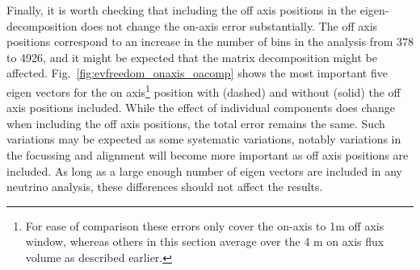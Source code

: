 \documentclass{article}
\begin{document}
Finally, it is worth checking that including the off axis positions in the eigen-decomposition does not change the on-axis error substantially. The off axis positions correspond to an increase in the number of bins in the analysis from 378 to 4926, and it might be expected that the matrix decomposition might be affected. Fig.~\ref{fig:evfreedom_onaxis_oacomp} shows the most important five eigen vectors for the on axis\footnote{For ease of comparison these errors only cover the on-axis to 1m off axis window, whereas others in this section average over the 4 m on axis flux volume as described earlier.} position with (dashed) and without (solid) the off axis positions included. While the effect of individual components does change when including the off axis positions, the total error remains the same. Such variations may be expected as some systematic variations, notably variations in the focussing and alignment will become more important as off axis positions are included. As long as a large enough number of eigen vectors are included in any neutrino analysis, these differences should not affect the results.
\end{document}
